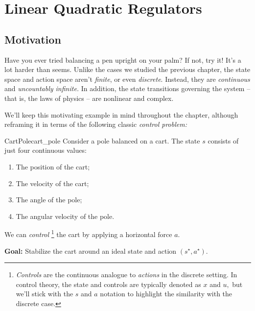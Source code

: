\documentclass[../main/main]{subfiles}
\begin{document}
    
\chapter[LQR]{Linear Quadratic Regulators}


\section{Motivation}

Have you ever tried balancing a pen upright on your palm?
If not, try it! It's a lot harder than seems.
Unlike the cases we studied the previous chapter,
the state space and action space aren't \emph{finite}, or even \emph{discrete}.
Instead, they are \emph{continuous} and \emph{uncountably infinite.}
In addition, the state transitions governing the system -- that is, the laws of physics --
are nonlinear and complex.

We'll keep this motivating example in mind throughout the chapter,
although reframing it in terms of the following classic \emph{control problem:}

\begin{example}{CartPole}{cart_pole}
    Consider a pole balanced on a cart.
    The state $s$ consists of just four continuous values:

    \begin{enumerate}
        \item The position of the cart;
        \item The velocity of the cart;
        \item The angle of the pole;
        \item The angular velocity of the pole.
    \end{enumerate}

    \noindent
    We can \emph{control}
    \footnote{\emph{Controls} are the continuous analogue to \emph{actions} in the discrete setting. In control theory, the state and controls are typically denoted as
    $x$ and $u,$ but we'll stick with the $s$ and $a$ notation to highlight the
    similarity with the discrete case.}
    the cart by applying a horizontal force $a$.

    \noindent
    \textbf{Goal:} Stabilize the cart around an ideal state and action $(s^\star, a^\star)$.
\end{example}
\end{document}
